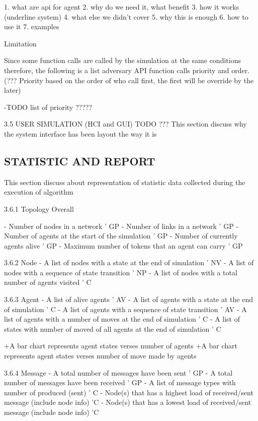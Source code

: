 \begin{description}
\begin{description}
\begin{description}
\begin{description}
1. what are api for agent
2. why do we need it, what benefit
3. how it works (underline system)
4. what else we didn't cover
5. why this is enough
6. how to use it
7. examples


Limitation

Since some function calls are called by the simulation at the same conditions therefore, the following is a list adversary API function calls priority and order. (??? Priority based on the order of who call first, the first will be override by the later)

-TODO list of priority ?????

3.5 USER SIMULATION (HCI and GUI) TODO ???
This section discuss why the system interface has been layout the way it is

\subsection{STATISTIC AND REPORT}
This section discuss about representation of statistic data collected during the execution of algorithm

3.6.1 Topology Overall

- Number of nodes in a network ' GP
- Number of links in a network ' GP
- Number of agents at the start of the simulation ' GP
- Number of currently agents alive ' GP
- Maximum number of tokens that an agent can carry ' GP

3.6.2 Node
- A list of nodes with a state at the end of simulation ' NV
- A list of nodes with a sequence of state transition ' NP
- A list of nodes with a total number of agents visited ' C

3.6.3 Agent
- A list of alive agents ' AV
- A list of agents with a state at the end of simulation ' C
- A list of agents with a sequence of state transition ' AV
- A list of agents with a number of moves at the end of simulation ' C
- A list of states with number of moved of all agents at the end of simulation  ' C

+A bar chart represents agent states verses number of agents
+A bar chart represents agent states verses number of move made by agents


3.6.4 Message
- A total number of messages have been sent ' GP
- A total number of messages have been received ' GP
- A list of message types with number of produced (sent) ' C
- Node(s) that has a highest load of received/sent message (include node info) 'C
- Node(s) that has a lowest load of received/sent message (include node info) 'C


\end{description}
\end{description}
\end{description}
\end{description}
